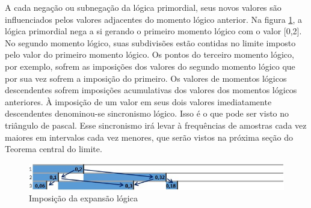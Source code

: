 A cada negação ou subnegação da lógica primordial, seus novos valores são influenciados pelos valores adjacentes do momento lógico anterior. Na figura \ref{fig:imposition_of_binomial_expansion}, a lógica primordial nega a si gerando o primeiro momento lógico com o valor [0,2].  No segundo momento lógico, suas subdivisões estão contidas no limite imposto pelo valor do primeiro momento lógico. Os pontos do terceiro momento lógico, por exemplo, sofrem as imposições dos valores do segundo momento lógico que por sua vez sofrem a imposição do primeiro. Os valores de momentos lógicos descendentes sofrem imposições acumulativas dos valores dos momentos lógicos anteriores. À imposição de um valor em seus dois valores imediatamente descendentes denominou-se sincronismo lógico. Isso é o que pode ser visto no triângulo de pascal. Esse sincronismo irá levar à frequências de amostras cada vez maiores em intervalos cada vez menores, que serão vistos na próxima seção do Teorema central do limite.
	\begin{figure}[H]
	\caption{Imposição da expansão lógica}
	\label{fig:imposition_of_binomial_expansion}
	\centering
	\includegraphics[scale=.85]{sections/images/imposition_of_binomial_expansion.jpg}
	\end{figure}

